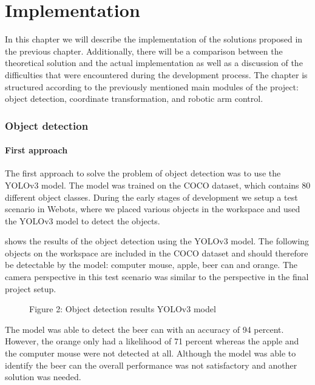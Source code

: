 
\chapter{Implementation} %

\label{implementation} %


In this chapter we will describe the implementation of the solutions proposed in the previous chapter. Additionally, there will be a comparison between the theoretical solution and the actual implementation as well as a discussion of the difficulties that were encountered during the development process. The chapter is structured according to the previously mentioned main modules of the project: object detection, coordinate transformation, and robotic arm control.
\subsection{Object detection}

\subsubsection{First approach}
The first approach to solve the problem of object detection was to use the YOLOv3 model. The model was trained on the COCO dataset, which contains 80 different object classes. During the early stages of development we setup a test scenario in Webots, where we placed various objects in the workspace and used the YOLOv3 model to detect the objects. 

 shows the results of the object detection using the YOLOv3 model. The following objects on the workspace are included in the COCO dataset and should therefore be detectable by the model: computer mouse, apple, beer can and orange. The camera perspective in this test scenario was similar to the perspective in the final project setup.  

\begin{figure}[!h]
    \centering
    \caption{Figure 2: Object detection results YOLOv3 model }
    \label{fig:object_detection_results}
\end{figure}


The model was able to detect the beer can with an accuracy of 94 percent. However, the orange only had a likelihood of 71 percent whereas the apple and the computer mouse were not detected at all. Although the model was able to identify the beer can the overall performance was not satisfactory and another solution was needed.

